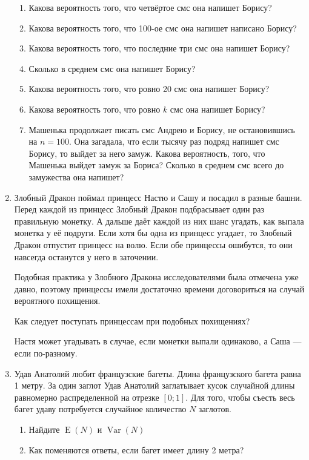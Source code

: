 \documentclass[nobib]{tufte-handout}
\DeclareMathOperator{\Var}{Var}
\DeclareMathOperator{\E}{E}
\begin{document}
\begin{enumerate}
\begin{enumerate}
\item Какова вероятность того, что четвёртое смс она напишет Борису?
\item Какова вероятность того, что 100-ое смс она напишет написано Борису?
\item Какова вероятность того, что последние три смс она напишет Борису?
\item Сколько в среднем смс она напишет Борису?
\item Какова вероятность того, что ровно 20 смс она напишет Борису?
\item Какова вероятность того, что ровно $k$ смс она напишет Борису?
\item Машенька продолжает писать смс Андрею и Борису, не остановившись на $n=100$. Она загадала, что если тысячу раз подряд напишет смс Борису, то выйдет за него замуж. Какова вероятность, того, что Машенька выйдет замуж за Бориса? Сколько в среднем смс всего до замужества она напишет?
\end{enumerate}

\begin{solution}


\end{solution}

\item Злобный Дракон поймал принцесс Настю и Сашу и посадил в разные башни. Перед каждой из принцесс Злобный Дракон подбрасывает один раз правильную монетку. А дальше даёт каждой из них шанс угадать, как выпала монетка у её подруги. Если хотя бы одна из принцесс угадает, то Злобный Дракон отпустит принцесс на волю. Если обе принцессы ошибутся, то они навсегда останутся у него в заточении.

Подобная практика у Злобного Дракона исследователями была отмечена уже давно, поэтому принцессы имели достаточно времени договориться на случай вероятного похищения.

Как следует поступать принцессам при подобных похищениях?

\begin{solution}
Настя может угадывать в случае, если монетки выпали одинаково, а Саша --- если по-разному.
\end{solution}


\item Удав Анатолий любит французские багеты. Длина французского багета равна 1 метру. За один заглот Удав Анатолий заглатывает кусок случайной длины равномерно распределенной на отрезке $[0;1]$. Для того, чтобы съесть весь багет удаву потребуется случайное количество $N$ заглотов. 
\begin{enumerate}
\item Найдите $\E(N)$ и $\Var(N)$
\item Как поменяются ответы, если багет имеет длину 2 метра?
\end{enumerate}


\end{enumerate}
\end{document}
